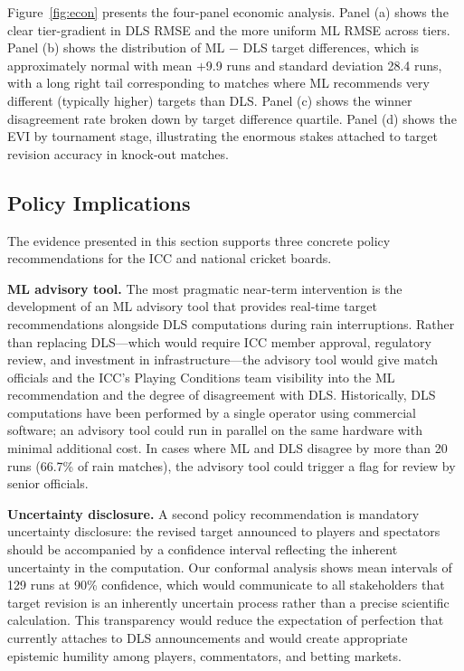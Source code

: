 \documentclass[10pt,a4paper,twocolumn]{article}
\begin{document}
Figure~\ref{fig:econ} presents the four-panel economic analysis. Panel (a) shows the clear tier-gradient in DLS RMSE and the more uniform ML RMSE across tiers. Panel (b) shows the distribution of ML $-$ DLS target differences, which is approximately normal with mean $+$9.9 runs and standard deviation 28.4 runs, with a long right tail corresponding to matches where ML recommends very different (typically higher) targets than DLS. Panel (c) shows the winner disagreement rate broken down by target difference quartile. Panel (d) shows the EVI by tournament stage, illustrating the enormous stakes attached to target revision accuracy in knock-out matches.

\subsection{Policy Implications}

The evidence presented in this section supports three concrete policy recommendations for the ICC and national cricket boards.

\textbf{ML advisory tool.} The most pragmatic near-term intervention is the development of an ML advisory tool that provides real-time target recommendations alongside DLS computations during rain interruptions. Rather than replacing DLS---which would require ICC member approval, regulatory review, and investment in infrastructure---the advisory tool would give match officials and the ICC's Playing Conditions team visibility into the ML recommendation and the degree of disagreement with DLS. Historically, DLS computations have been performed by a single operator using commercial software; an advisory tool could run in parallel on the same hardware with minimal additional cost. In cases where ML and DLS disagree by more than 20 runs (66.7\% of rain matches), the advisory tool could trigger a flag for review by senior officials.

\textbf{Uncertainty disclosure.} A second policy recommendation is mandatory uncertainty disclosure: the revised target announced to players and spectators should be accompanied by a confidence interval reflecting the inherent uncertainty in the computation. Our conformal analysis shows mean intervals of 129 runs at 90\% confidence, which would communicate to all stakeholders that target revision is an inherently uncertain process rather than a precise scientific calculation. This transparency would reduce the expectation of perfection that currently attaches to DLS announcements and would create appropriate epistemic humility among players, commentators, and betting markets.
\end{document}
